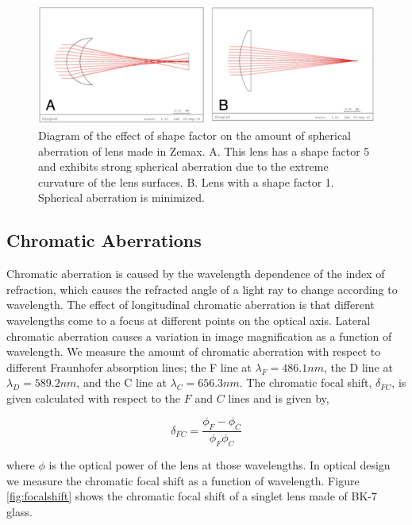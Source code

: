 \begin{figure}
    \centering
    \includegraphics[width=.8\textwidth]{Chapter Materials/Chapter Three Materials/ShapeFactor.png}
    \caption{ Diagram of the effect of shape factor on the amount of spherical aberration of lens made in Zemax. A. This lens has a shape factor 5 and exhibits strong spherical aberration due to the extreme curvature of the lens surfaces. B. Lens with a shape factor 1. Spherical aberration is minimized.}
    \label{fig:shapefactor}
\end{figure}


\subsection{Chromatic Aberrations}

Chromatic aberration is caused by the wavelength dependence of the index of refraction, which causes the refracted angle of a light ray to change according to wavelength. The effect of longitudinal chromatic aberration is that different wavelengths come to a focus at different points on the optical axis. Lateral chromatic aberration causes a variation in image magnification as a function of wavelength. We measure the amount of chromatic aberration with respect to different Fraunhofer absorption lines; the F line at $\lambda_F=486.1 nm$, the D line at $\lambda_D=589.2 nm$, and the C line at $\lambda_C= 656.3 nm$. The chromatic focal shift, $\delta_{FC}$,  is given calculated with respect to the $F$ and $C$ lines and is given by,

\begin{equation}
    \delta_{FC}=\frac{\phi_F-\phi_C}{\phi_F \phi_C}
\end{equation}


where $\phi$ is the optical power of the lens at those wavelengths. In optical design we measure the chromatic focal shift as a function of wavelength. Figure \ref{fig:focalshift} shows the chromatic focal shift of a singlet lens made of BK-7 glass.

